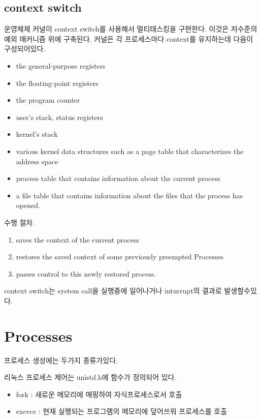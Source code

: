\subsection{context switch}

운영체제 커널이 context switch를 사용해서 멀티태스킹을 구현한다. 이것은 저수준의 예외 매커니즘 위에 구축된다.
커널은 각 프로세스마다 context를 유지하는데 다음이 구성되어있다.
\begin{itemize}
    \item  the general-purpose registers
    \item the floating-point registers
    \item the program counter
    \item user’s stack, status registers
    \item kernel’s stack
    \item various kernel data structures such as a page table that characterizes the address space
    \item process table that contains information about the current process
    \item a file table that contains information about the files that the process has opened.
\end{itemize}




수행 절차.
\begin{enumerate}
    \item saves the context of the current process
    \item restores the saved context of some previously preempted Processes
    \item passes control to this newly restored process.
\end{enumerate}

context switch는 system call을 실행중에 일어나거나 inturrupt의 결과로 발생할수있다.

\section{Processes}

프로세스 생성에는 두가지 종류가있다.

리눅스 프로세스 제어는 unistd.h에 함수가 정의되어 있다.
\begin{itemize}
    \item fork : 새로운 메모리에 매핑하여 자식프로세스로서 호출
    \item exevce : 현재 실행되는 프로그램의 메모리에 덮어쓰워 프로세스를 호출
\end{itemize}

